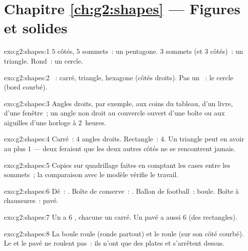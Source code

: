 \section*{Chapitre \ref{ch:g2:shapes} --- Figures et solides}

\begin{solution}{exo:g2:shapes:1}
$5$ côtés, $5$ sommets~: un pentagone. $3$ sommets (et $3$
côtés)~: un triangle. Rond~: un cercle.
\end{solution}

\begin{solution}{exo:g2:shapes:2}
~: carré, triangle, hexagone (côtés droits). Pas un
~: le cercle (bord courbé).
\end{solution}

\begin{solution}{exo:g2:shapes:3}
Angles droits, par exemple, aux coins du tableau, d'un livre, d'une
fenêtre~; un angle non droit au couvercle ouvert d'une boîte ou
aux aiguilles d'une horloge à $2$~heures.
\end{solution}

\begin{solution}{exo:g2:shapes:4}
Carré~: $4$ angles droits. Rectangle~: $4$. Un triangle peut en
avoir au plus $1$ --- deux feraient que les deux autres côtés ne
se rencontrent jamais.
\end{solution}

\begin{solution}{exo:g2:shapes:5}
Copies sur quadrillage faites en comptant les cases entre les
sommets~; la comparaison avec le modèle vérifie le travail.
\end{solution}

\begin{solution}{exo:g2:shapes:6}
Dé~: . Boîte de conserve~: . Ballon de football~:
boule. Boîte à chaussures~: pavé.
\end{solution}

\begin{solution}{exo:g2:shapes:7}
Un  a $6$ , chacune un carré. Un pavé a aussi $6$ 
(des rectangles).
\end{solution}

\begin{solution}{exo:g2:shapes:8}
La boule roule (ronde partout) et le  roule (sur son côté
courbé). Le  et le pavé ne roulent pas~: ils n'ont que des
 plates et s'arrêtent dessus.
\end{solution}


